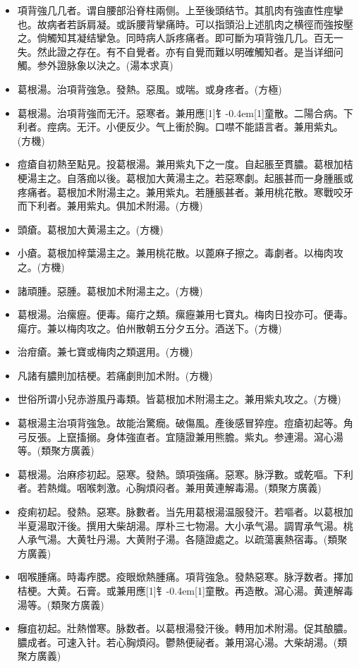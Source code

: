\documentclass[11pt,oneside,b5paper]{ctexbook}
\begin{document}
\begin{flushleft}
\begin{itemize}
\item 項背強几几者。谓自腰部沿脊柱兩侧。上至後頭结节。其肌肉有強直性痙攣也。故病者若訴肩凝。或訴腰背攣痛時。可以指頭沿上述肌肉之横徑而強按壓之。倘觸知其凝结攣急。同時病人訴疼痛者。即可斷为項背強几几。百无一失。然此證之存在。有不自覺者。亦有自覺而難以明確觸知者。是当详细问觸。参外證脉象以決之。(湯本求真)
\item 葛根湯。治項背強急。發熱。惡風。或喘。或身疼者。(方極)
\item 葛根湯。治項背強而无汗。惡寒者。兼用應{\hbox{\scalebox{0.7}[1]{钅}\kern-0.4em\scalebox{0.7}[1]{童}}}散。二陽合病。下利者。痙病。无汗。小便反少。气上衝於胸。口噤不能語言者。兼用紫丸。(方機)
\item 痘瘡自初熱至點見。投葛根湯。兼用紫丸下之一度。自起脹至貫膿。葛根加桔梗湯主之。自落痂以後。葛根加大黄湯主之。若惡寒劇。起脹甚而一身腫脹或疼痛者。葛根加术附湯主之。兼用紫丸。若腫脹甚者。兼用桃花散。寒戰咬牙而下利者。兼用紫丸。俱加术附湯。(方機)
\item 頭瘡。葛根加大黄湯主之。(方機)
\item 小瘡。葛根加梓葉湯主之。兼用桃花散。以蓖麻子擦之。毒劇者。以梅肉攻之。(方機)
\item 諸頑腫。惡腫。葛根加术附湯主之。(方機)
\item 葛根湯。治瘰癧。便毒。瘍疔之類。瘰癧兼用七寶丸。梅肉日投亦可。便毒。瘍疔。兼以梅肉攻之。伯州散朝五分夕五分。酒送下。(方機)
\item 治疳瘡。兼七寶或梅肉之類選用。(方機)
\item 凡諸有膿則加桔梗。若痛劇則加术附。(方機)
\item 世俗所谓小兒赤游風丹毒類。皆葛根加术附湯主之。兼用紫丸攻之。(方機)
\item 葛根湯主治項背強急。故能治驚癇。破傷風。產後感冒猝痙。痘瘡初起等。角弓反張。上竄搐搦。身体強直者。宜隨證兼用熊膽。紫丸。参連湯。瀉心湯等。(類聚方廣義)
\item 葛根湯。治麻疹初起。惡寒。發熱。頭項強痛。惡寒。脉浮數。或乾嘔。下利者。若熱熾。咽喉刺激。心胸煩闷者。兼用黄連解毒湯。(類聚方廣義)
\item 疫痢初起。發熱。惡寒。脉數者。当先用葛根湯温服發汗。若嘔者。以葛根加半夏湯取汗後。撰用大柴胡湯。厚朴三七物湯。大小承气湯。調胃承气湯。桃人承气湯。大黄牡丹湯。大黄附子湯。各隨證處之。以疏蕩裏熱宿毒。(類聚方廣義)
\item 咽喉腫痛。時毒痄腮。疫眼焮熱腫痛。項背強急。發熱惡寒。脉浮数者。擇加桔梗。大黄。石膏。或兼用應{\hbox{\scalebox{0.7}[1]{钅}\kern-0.4em\scalebox{0.7}[1]{童}}}散。再造散。瀉心湯。黄連解毒湯等。(類聚方廣義)
\item 癰疽初起。壯熱憎寒。脉数者。以葛根湯發汗後。轉用加术附湯。促其酿膿。膿成者。可速入针。若心胸煩闷。鬱熱便祕者。兼用瀉心湯。大柴胡湯。(類聚方廣義)
\end{itemize}


\end{flushleft}
\end{document}
